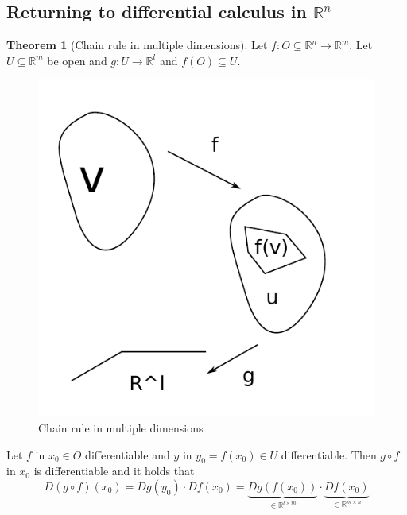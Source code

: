 \documentclass[a4paper,landscape,twocolumn]{article}
\theoremstyle{definition}
\newtheorem{theorem}{Theorem}
\begin{document}
\subsection{Returning to differential calculus in $\mathbb R^n$}
%
\begin{theorem}[Chain rule in multiple dimensions]
  Let $f: O \subseteq \mathbb R^n \to \mathbb R^m$.
  Let $U \subseteq \mathbb R^m$ be open and $g: U \to \mathbb R^l$ and $f(O) \subseteq U$.

  \begin{figure}[!h]
    \begin{center}
      \includegraphics{img/multiple_dimension_chain_rule.pdf}
      \caption{Chain rule in multiple dimensions}
      \label{img:chain-rule}
    \end{center}
  \end{figure}

  Let $f$ in $x_0 \in O$ differentiable and $y$ in $y_0 = f(x_0) \in U$ differentiable.
  Then $g \circ f$ in $x_0$ is differentiable and it holds that
  \[ D(g \circ f)(x_0) = Dg(y_0) \cdot Df(x_0) = \underbrace{Dg(f(x_0))}_{\in \mathbb R^{l\times m}} \cdot \underbrace{Df(x_0)}_{\in \mathbb R^{m\times n}} \]
\end{theorem}
\end{document}
